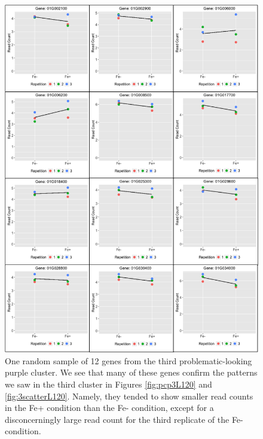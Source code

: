 \documentclass[11pt,a4paper,oldfontcommands,openany]{memoir}
\numberwithin{equation}{section} %
\begin{document}
\begin{figure}[H]
  \centering
  \includegraphics[width=\textwidth]{indSBGenes1}
  \caption{One random sample of 12 genes from the third problematic-looking purple cluster. We see that many of these genes confirm the patterns we saw in the third cluster in Figures \ref{fig:pcp3L120} and \ref{fig:3scatterL120}. Namely, they tended to show smaller read counts in the Fe+ condition than the Fe- condition, except for a disconcerningly large read count for the third replicate of the Fe- condition.}
  \label{fig:indSBGenes1}
\end{figure}
\end{document}
